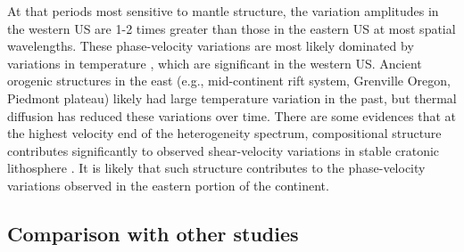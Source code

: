At that periods most sensitive to mantle structure, the variation amplitudes in the western US are 1-2 times greater than those in the eastern US at most spatial wavelengths. These phase-velocity variations are most likely dominated by variations in temperature \citep[e.g.,][]{Priestley:2013il,Dalton:2014fv}, which are significant in the western US.  Ancient orogenic structures in the east (e.g., mid-continent rift system, Grenville Oregon, Piedmont plateau) likely had large temperature variation in the past, but thermal diffusion has reduced these variations over time. There are some evidences that at the highest velocity end of the heterogeneity spectrum, compositional structure contributes significantly to observed shear-velocity variations in stable cratonic lithosphere \citep{Dalton:2009fj}. It is likely that such structure contributes to the phase-velocity variations observed in the eastern portion of the continent.




\subsection{Comparison with other studies}

